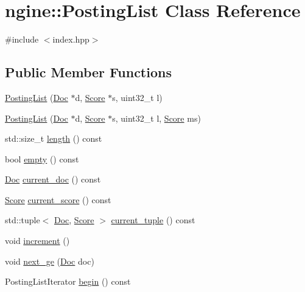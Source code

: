\hypertarget{classngine_1_1PostingList}{}\section{ngine\+:\+:Posting\+List Class Reference}
\label{classngine_1_1PostingList}


{\ttfamily \#include $<$index.\+hpp$>$}

\subsection*{Public Member Functions}
\begin{DoxyCompactItemize}
\item 
\hyperlink{classngine_1_1PostingList_ae1fe89ac9f77d8f73083fa71ed3abcfd}{Posting\+List} (\hyperlink{structngine_1_1Doc}{Doc} $\ast$d, \hyperlink{structngine_1_1Score}{Score} $\ast$s, uint32\+\_\+t l)
\item 
\hyperlink{classngine_1_1PostingList_a3c6df1462eaf6e8037871941dc667df8}{Posting\+List} (\hyperlink{structngine_1_1Doc}{Doc} $\ast$d, \hyperlink{structngine_1_1Score}{Score} $\ast$s, uint32\+\_\+t l, \hyperlink{structngine_1_1Score}{Score} ms)
\item 
std\+::size\+\_\+t \hyperlink{classngine_1_1PostingList_a26b18cbed78dd66dab739abef4d8db64}{length} () const
\item 
bool \hyperlink{classngine_1_1PostingList_a1da152c2368b34a2c5d00acae4a57284}{empty} () const
\item 
\hyperlink{structngine_1_1Doc}{Doc} \hyperlink{classngine_1_1PostingList_a25beb7e8eba030e57290f72277ab6893}{current\+\_\+doc} () const
\item 
\hyperlink{structngine_1_1Score}{Score} \hyperlink{classngine_1_1PostingList_a028af2db5a5232f15a12e914c13be902}{current\+\_\+score} () const
\item 
std\+::tuple$<$ \hyperlink{structngine_1_1Doc}{Doc}, \hyperlink{structngine_1_1Score}{Score} $>$ \hyperlink{classngine_1_1PostingList_a4b286d31784bd384865e981e4e27815e}{current\+\_\+tuple} () const
\item 
void \hyperlink{classngine_1_1PostingList_a1420be319189871bbb7f7514dc20a312}{increment} ()
\item 
void \hyperlink{classngine_1_1PostingList_ad4d7f09342e73fd944be41e324ff90c5}{next\+\_\+ge} (\hyperlink{structngine_1_1Doc}{Doc} doc)
\item 
Posting\+List\+Iterator \hyperlink{classngine_1_1PostingList_abec7714715aa8bc59ff3df232e2083a3}{begin} () const

\end{DoxyCompactItemize}
